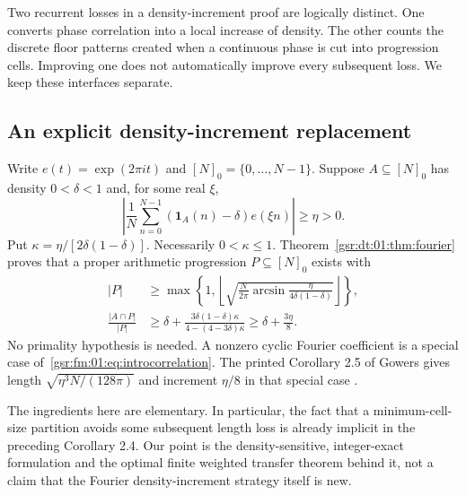\documentclass[11pt,letterpaper]{article}
\numberwithin{equation}{section}
\theoremstyle{definition}
\theoremstyle{remark}
\newcommand{\one}{\mathbf 1}
\newcommand{\1}{\mathbf 1}
\newcommand{\floor}[1]{\left\lfloor#1\right\rfloor}
\begin{document}
Two recurrent losses in a density-increment proof are logically distinct.
One converts phase correlation into a local increase of density. The other
counts the discrete floor patterns created when a continuous phase is cut
into progression cells. Improving one does not automatically improve every
subsequent loss. We keep these interfaces separate.

\subsection{An explicit density-increment replacement}
Write $e(t)=\exp(2\pi i t)$ and $[N]_0=\{0,\ldots,N-1\}$.
Suppose $A\subseteq[N]_0$ has density $0<\delta<1$ and, for some real $\xi$,
\begin{equation}\label{gsr:fm:01:eq:introcorrelation}
 \left|\frac1N\sum_{n=0}^{N-1}(\one_A(n)-\delta)e(\xi n)\right|\ge\eta>0.
\end{equation}
Put $\kappa=\eta/[2\delta(1-\delta)]$. Necessarily $0<\kappa\le1$.
Theorem~\ref{gsr:dt:01:thm:fourier} proves that a proper arithmetic progression
$P\subseteq[N]_0$ exists with
\begin{align}
 |P|&\ge \max\left\{1,
 \floor{\sqrt{\frac{N}{2\pi}\arcsin\frac{\eta}{4\delta(1-\delta)}}}
 \right\},\label{gsr:fm:01:eq:introlength}\\
 \frac{|A\cap P|}{|P|}&\ge
 \delta+\frac{3\delta(1-\delta)\kappa}{4-(4-3\delta)\kappa}
 \ge\delta+\frac{3\eta}{8}.\label{gsr:fm:01:eq:introincrement}
\end{align}
No primality hypothesis is needed. A nonzero cyclic Fourier coefficient
is a special case of~\eqref{gsr:fm:01:eq:introcorrelation}.
The printed Corollary 2.5 of Gowers gives length
$\sqrt{\eta^3N/(128\pi)}$ and increment $\eta/8$ in that special case
\cite[Corollary 2.5]{gowers}.

The ingredients here are elementary. In particular, the fact that a
minimum-cell-size partition avoids some subsequent length loss is already
implicit in the preceding Corollary 2.4. Our point is the density-sensitive,
integer-exact formulation and the optimal finite weighted transfer theorem
behind it, not a claim that the Fourier density-increment strategy itself
is new.
\end{document}
